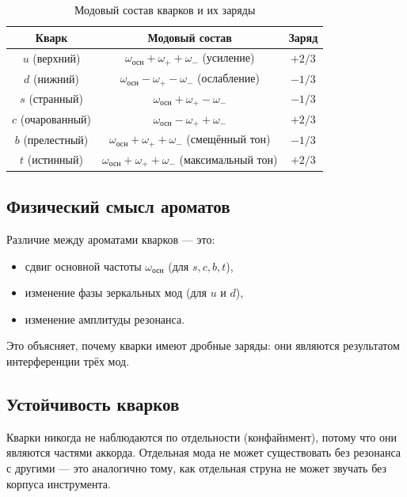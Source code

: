 \documentclass[12pt,a4paper]{article}
\begin{document}
\begin{table}[h]
\centering
\caption{Модовый состав кварков и их заряды}
\begin{tabular}{c|c|c}
\toprule
\textbf{Кварк} & \textbf{Модовый состав} & \textbf{Заряд} \\
\midrule
\( u \) (верхний) & \( \omega_{\text{осн}} + \omega_{+} + \omega_{-} \) (усиление) & \( +2/3 \) \\
\( d \) (нижний) & \( \omega_{\text{осн}} - \omega_{+} - \omega_{-} \) (ослабление) & \( -1/3 \) \\
\( s \) (странный) & \( \omega_{\text{осн}} + \omega_{+} - \omega_{-} \) & \( -1/3 \) \\
\( c \) (очарованный) & \( \omega_{\text{осн}} - \omega_{+} + \omega_{-} \) & \( +2/3 \) \\
\( b \) (прелестный) & \( \omega_{\text{осн}} + \omega_{+} + \omega_{-} \) (смещённый тон) & \( -1/3 \) \\
\( t \) (истинный) & \( \omega_{\text{осн}} + \omega_{+} + \omega_{-} \) (максимальный тон) & \( +2/3 \) \\
\bottomrule
\end{tabular}
\end{table}

\subsection{Физический смысл ароматов}

Различие между ароматами кварков — это:
\begin{itemize}
\item сдвиг основной частоты \(\omega_{\text{осн}}\) (для \(s, c, b, t\)),
\item изменение фазы зеркальных мод (для \(u\) и \(d\)),
\item изменение амплитуды резонанса.
\end{itemize}

Это объясняет, почему кварки имеют дробные заряды: они являются результатом интерференции трёх мод.

\subsection{Устойчивость кварков}

Кварки никогда не наблюдаются по отдельности (конфайнмент), потому что они являются частями аккорда. Отдельная мода не может существовать без резонанса с другими — это аналогично тому, как отдельная струна не может звучать без корпуса инструмента.
\end{document}
